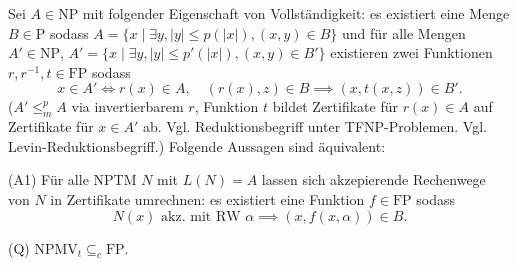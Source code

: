 \documentclass[nofonts]{uebung}
\begin{document}
\begin{center}\ast\end{center}

\noindent
%

Sei $A\in\mathrm{NP}$ mit folgender Eigenschaft von Vollständigkeit: es existiert eine Menge $B\in\mathrm P$ sodass $A=\{x\mid \exists y, |y|\leq p(|x|), (x,y)\in B\}$ und für alle Mengen $A'\in\mathrm{NP}$, $A'=\{x\mid \exists y, |y|\leq p'(|x|), (x,y)\in B'\}$ existieren zwei Funktionen $r,r^{-1},t\in\mathrm{FP}$ sodass
\[ x\in A' \iff r(x) \in A, \quad (r(x),z)\in B \implies (x, t(x,z)) \in B'. \]
($A'\leq_m^p A$ via invertierbarem $r$, Funktion $t$ bildet Zertifikate für $r(x)\in A$ auf Zertifikate für $x\in A'$ ab. Vgl. Reduktionsbegriff unter TFNP-Problemen. Vgl. Levin-Reduktionsbegriff.)
Folgende Aussagen sind äquivalent:
\begin{statements}
    \item[(A1)] Für alle NPTM $N$ mit $L(N)=A$ lassen sich akzepierende Rechenwege von $N$ in Zertifikate umrechnen: es existiert eine Funktion $f\in\mathrm{FP}$ sodass
        \[ N(x) \text{ akz. mit RW $\alpha$} \implies (x,f(x,\alpha))\in B. \]
    \item[(Q)] $\mathrm{NPMV}_t \subseteq_c \mathrm{FP}$.
\end{statements}

\begin{center}\ast\end{center}
\end{document}
